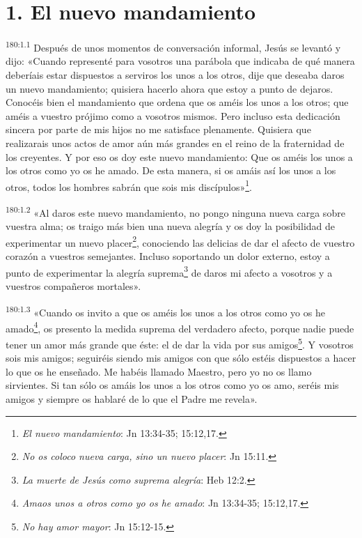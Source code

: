 \section*{1. El nuevo mandamiento}
\par 
\textsuperscript{180:1.1} Después de unos momentos de conversación informal, Jesús se levantó y dijo: «Cuando representé para vosotros una parábola que indicaba de qué manera deberíais estar dispuestos a serviros los unos a los otros, dije que deseaba daros un nuevo mandamiento; quisiera hacerlo ahora que estoy a punto de dejaros. Conocéis bien el mandamiento que ordena que os améis los unos a los otros; que améis a vuestro prójimo como a vosotros mismos. Pero incluso esta dedicación sincera por parte de mis hijos no me satisface plenamente. Quisiera que realizarais unos actos de amor aún más grandes en el reino de la fraternidad de los creyentes. Y por eso os doy este nuevo mandamiento: Que os améis los unos a los otros como yo os he amado. De esta manera, si os amáis así los unos a los otros, todos los hombres sabrán que sois mis discípulos»\footnote{\textit{El nuevo mandamiento}: Jn 13:34-35; 15:12,17.}.

\par 
\textsuperscript{180:1.2} «Al daros este nuevo mandamiento, no pongo ninguna nueva carga sobre vuestra alma; os traigo más bien una nueva alegría y os doy la posibilidad de experimentar un nuevo placer\footnote{\textit{No os coloco nueva carga, sino un nuevo placer}: Jn 15:11.}, conociendo las delicias de dar el afecto de vuestro corazón a vuestros semejantes. Incluso soportando un dolor externo, estoy a punto de experimentar la alegría suprema\footnote{\textit{La muerte de Jesús como suprema alegría}: Heb 12:2.} de daros mi afecto a vosotros y a vuestros compañeros mortales».

\par 
\textsuperscript{180:1.3} «Cuando os invito a que os améis los unos a los otros como yo os he amado\footnote{\textit{Amaos unos a otros como yo os he amado}: Jn 13:34-35; 15:12,17.}, os presento la medida suprema del verdadero afecto, porque nadie puede tener un amor más grande que éste: el de dar la vida por sus amigos\footnote{\textit{No hay amor mayor}: Jn 15:12-15.}. Y vosotros sois mis amigos; seguiréis siendo mis amigos con que sólo estéis dispuestos a hacer lo que os he enseñado. Me habéis llamado Maestro, pero yo no os llamo sirvientes. Si tan sólo os amáis los unos a los otros como yo os amo, seréis mis amigos y siempre os hablaré de lo que el Padre me revela».

